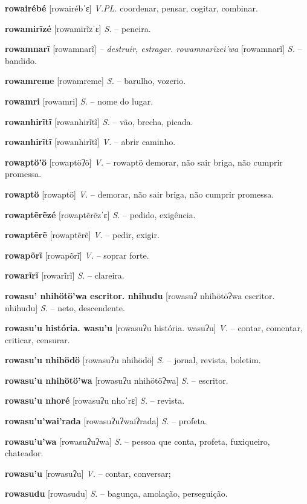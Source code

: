 \textbf{rowairébé} [rowairébˈɛ] \textit{V.PL.} coordenar, pensar, cogitar, combinar.

\textbf{rowamirĩzé} [rowamirĩzˈɛ] \textit{S.} -- peneira.

\textbf{rowamnarĩ} [rowamnarĩ] \textit{-- destruir, estragar. rowamnarĩzei'wa} [rowamnarĩ] \textit{S.} -- bandido.

\textbf{rowamreme} [rowamreme] \textit{S.} -- barulho, vozerio.

\textbf{rowamri} [rowamri] \textit{S.} -- nome do lugar.

\textbf{rowanhirĩtĩ} [rowanhirĩtĩ] \textit{S.} -- vão, brecha, picada.

\textbf{rowanhirĩtĩ} [rowanhirĩtĩ] \textit{V.} -- abrir caminho.

\textbf{rowaptö'ö} [rowaptöʔö] \textit{V.} -- rowaptö demorar, não sair briga, não cumprir promessa.

\textbf{rowaptö} [rowaptö] \textit{V.} -- demorar, não sair briga, não cumprir promessa.

\textbf{rowaptẽrẽzé} [rowaptẽrẽzˈɛ] \textit{S.} -- pedido, exigência.

\textbf{rowaptẽrẽ} [rowaptẽrẽ] \textit{V.} -- pedir, exigir.

\textbf{rowapõrĩ} [rowapõrĩ] \textit{V.} -- soprar forte.

\textbf{rowarĩrĩ} [rowarĩrĩ] \textit{S.} -- clareira.

\textbf{rowasu' nhihötö'wa escritor. nhihudu} [rowasuʔ nhihötöʔwa escritor. nhihudu] \textit{S.} -- neto, descendente.

\textbf{rowasu'u história. wasu'u} [rowasuʔu história. wasuʔu] \textit{V.} -- contar, comentar, criticar, censurar.

\textbf{rowasu'u nhihödö} [rowasuʔu nhihödö] \textit{S.} -- jornal, revista, boletim.

\textbf{rowasu'u nhihötö'wa} [rowasuʔu nhihötöʔwa] \textit{S.} -- escritor.

\textbf{rowasu'u nhoré} [rowasuʔu nhoˈrɛ] \textit{S.} -- revista.

\textbf{rowasu'u'wai'rada} [rowasuʔuʔwaiʔrada] \textit{S.} -- profeta.

\textbf{rowasu'u'wa} [rowasuʔuʔwa] \textit{S.} -- pessoa que conta, profeta, fuxiqueiro, chateador.

\textbf{rowasu'u} [rowasuʔu] \textit{V.} -- contar, conversar;

\textbf{rowasudu} [rowasudu] \textit{S.} -- bagunça, amolação, perseguição.

